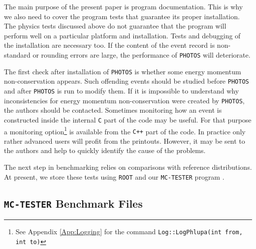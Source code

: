 \documentclass[]{Photos_interface_design}
\begin{document}
The main purpose of the present paper is program documentation. This is why
we also need to cover the program tests that guarantee its proper installation.
The physics tests discussed above 
do not guarantee that the program will perform well on a particular platform and installation. Tests and debugging of the installation
are necessary too.  If the content of the event record is non-standard or rounding errors are large, the performance of {\tt PHOTOS} will deteriorate.


The first check after installation of {\tt PHOTOS} is whether some energy momentum 
non-conservation appears. Such offending events should be studied
before {\tt PHOTOS}  and after {\tt PHOTOS} is run to modify them.
If it is impossible to understand why inconsistencies for energy momentum 
non-conservation were created by {\tt PHOTOS}, the authors should be contacted. Sometimes
monitoring how an event is constructed inside the internal {\tt C} part of the code
may be useful. For that purpose a monitoring option\footnote{See Appendix \ref{App:Logging}
for the command {\tt Log::LogPhlupa(int from, int to)}}
 is
available from the {\tt C++} part of the code. In practice only rather
 advanced users will profit from the printouts. However, it may be sent to
the authors and help to quickly identify the cause of the problems.


The next step in benchmarking relies on comparisons with reference distributions. 
At present, we store these tests using {\tt ROOT} \cite{Antcheva:2009zz} and our {\tt MC-TESTER} program \cite{Davidson:2008ma}.



\subsection{{\tt MC-TESTER} Benchmark Files}
\label{section:BenchmarkFiles}
\end{document}

